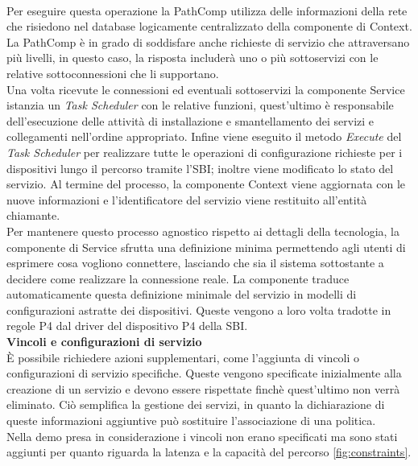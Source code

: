 \\Per eseguire questa operazione la PathComp utilizza delle informazioni della rete che risiedono nel database logicamente centralizzato della componente di Context.
La PathComp è in grado di soddisfare anche richieste di servizio che attraversano più livelli, in questo caso, la risposta includerà uno o più sottoservizi con le relative sottoconnessioni che li supportano.
\\Una volta ricevute le connessioni ed eventuali sottoservizi la componente Service istanzia un \textit{Task Scheduler} con le relative funzioni, %
quest'ultimo è responsabile dell'esecuzione delle attività di installazione e smantellamento dei servizi e collegamenti nell'ordine appropriato.
Infine viene eseguito il metodo \textit{Execute} del \textit{Task Scheduler} per realizzare tutte le operazioni di configurazione richieste per i dispositivi lungo il percorso tramite l'SBI; inoltre viene modificato lo stato del servizio.
Al termine del processo, la componente Context viene aggiornata con le nuove informazioni e l’identificatore del servizio viene restituito all’entità chiamante.
\\Per mantenere questo processo agnostico rispetto ai dettagli della tecnologia, la componente di Service 
sfrutta una definizione minima permettendo agli utenti di esprimere cosa vogliono connettere, lasciando che sia il sistema sottostante a decidere come realizzare la connessione reale.
La componente traduce automaticamente questa definizione minimale del servizio in modelli di configurazioni astratte dei dispositivi. 
Queste vengono a loro volta tradotte in regole P4 dal driver del dispositivo P4 della SBI.
\\\textbf{Vincoli e configurazioni di servizio}
\\È possibile richiedere azioni supplementari, come l'aggiunta di vincoli o configurazioni di servizio specifiche. 
Queste vengono specificate inizialmente alla creazione di un servizio e devono essere rispettate finchè quest'ultimo non verrà eliminato. 
Ciò semplifica la gestione dei servizi, in quanto la dichiarazione di queste informazioni aggiuntive può sostituire l'associazione di una politica.
\\Nella demo presa in considerazione i vincoli non erano specificati ma sono stati aggiunti per quanto riguarda la latenza e la capacità del percorso \ref{fig:constraints}.

